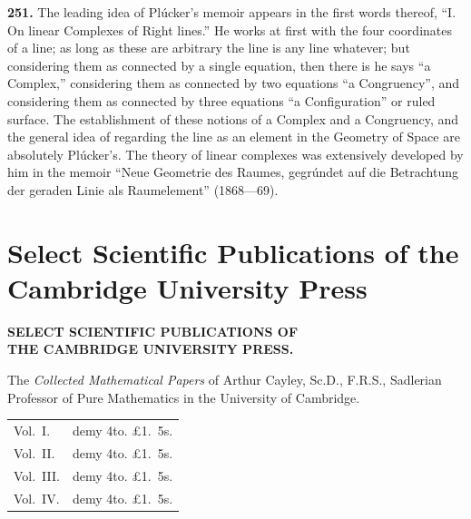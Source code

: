 \documentclass[11pt,a4paper]{book}
\begin{document}
\noindent\textbf{251.} The leading idea of Pl\'{u}cker's memoir appears in the first words thereof, ``I. On linear Complexes of Right lines.'' He works at first with the four coordinates of a line; as long as these are arbitrary the line is any line whatever; but considering them as connected by a single equation, then there is he says ``a Complex,'' considering them as connected by two equations ``a Congruency'', and considering them as connected by three equations ``a Configuration'' or ruled surface. The establishment of these notions of a Complex and a Congruency, and the general idea of regarding the line as an element in the Geometry of Space are absolutely Pl\'{u}cker's. The theory of linear complexes was extensively developed by him in the memoir ``Neue Geometrie des Raumes, gegr\'{u}ndet auf die Betrachtung der geraden Linie als Raumelement'' (1868---69).

\newpage


\section*{Select Scientific Publications of the Cambridge University Press}

\begin{center}
\Large\bfseries SELECT SCIENTIFIC PUBLICATIONS OF\\[0.5em]
THE CAMBRIDGE UNIVERSITY PRESS.
\end{center}

\vspace{1em}

\noindent The \textit{Collected Mathematical Papers} of Arthur Cayley, Sc.D., F.R.S., Sadlerian Professor of Pure Mathematics in the University of Cambridge.

\vspace{0.5em}

\begin{tabular}{ll}
Vol.~I. & demy 4to. \pounds1.~5s.\\
Vol.~II. & demy 4to. \pounds1.~5s.\\
Vol.~III. & demy 4to. \pounds1.~5s.\\
Vol.~IV. & demy 4to. \pounds1.~5s.
\end{tabular}
\end{document}

